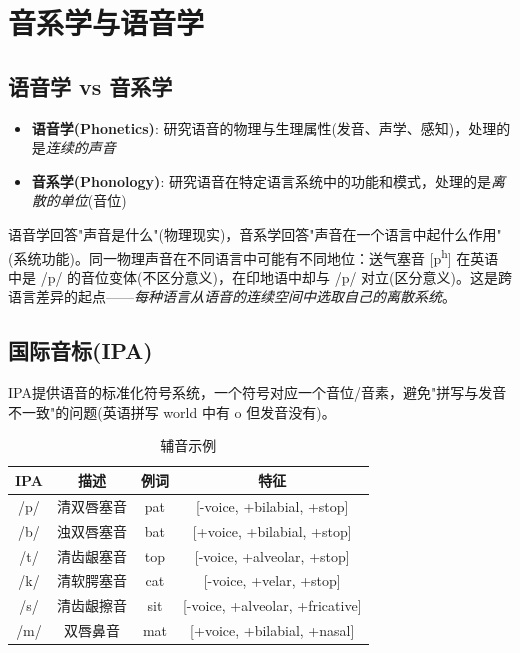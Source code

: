 \clearpage
\vspace*{\fill}
\section{音系学与语音学}
\vspace*{\fill}
\clearpage


\subsection{语音学 vs 音系学}

\begin{itemize}
    \item \textbf{语音学(Phonetics)}: 研究语音的物理与生理属性(发音、声学、感知)，处理的是\emph{连续的声音}
    \item \textbf{音系学(Phonology)}: 研究语音在特定语言系统中的功能和模式，处理的是\emph{离散的单位}(音位)
\end{itemize}

语音学回答"声音是什么"(物理现实)，音系学回答"声音在一个语言中起什么作用"(系统功能)。同一物理声音在不同语言中可能有不同地位：送气塞音 [p\textsuperscript{h}] 在英语中是 /p/ 的音位变体(不区分意义)，在印地语中却与 /p/ 对立(区分意义)。这是跨语言差异的起点——\emph{每种语言从语音的连续空间中选取自己的离散系统}。

\subsection{国际音标(IPA)}

IPA提供语音的标准化符号系统，一个符号对应一个音位/音素，避免"拼写与发音不一致"的问题(英语拼写 world 中有 o 但发音没有)。

\begin{table}[H]
\centering
\caption{辅音示例}
\begin{tabulary}{\textwidth}{@{}CCCC@{}}
\toprule
\textbf{IPA} & \textbf{描述} & \textbf{例词} & \textbf{特征} \\
\midrule
/p/ & 清双唇塞音 & pat & [-voice, +bilabial, +stop] \\
/b/ & 浊双唇塞音 & bat & [+voice, +bilabial, +stop] \\
/t/ & 清齿龈塞音 & top & [-voice, +alveolar, +stop] \\
/k/ & 清软腭塞音 & cat & [-voice, +velar, +stop] \\
/s/ & 清齿龈擦音 & sit & [-voice, +alveolar, +fricative] \\
/m/ & 双唇鼻音 & mat & [+voice, +bilabial, +nasal] \\
\bottomrule
\end{tabulary}
\end{table}

